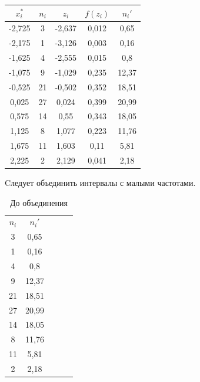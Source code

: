 \documentclass{article}
\begin{document}
\begin{center}
    \begin{table}[h]
        \centering
        \begin{tabular}{|*{5}{c|}}
            \hline
            $x_i^*$& $n_i$ &$z_i$ &$f(z_i)$& $n_i'$\\
            \hline
            -2,725 & 3 & -2,637 & 0,012 & 0,65 \\
            \hline
            -2,175 & 1 & -3,126 & 0,003 & 0,16 \\
            \hline
            -1,625 & 4 & -2,555 & 0,015 & 0,8 \\
            \hline
            -1,075 & 9 & -1,029 & 0,235 & 12,37 \\
            \hline
            -0,525 & 21 & -0,502 & 0,352 & 18,51 \\
            \hline
            0,025 & 27 & 0,024 & 0,399 & 20,99 \\
            \hline
            0,575 & 14 & 0,55 & 0,343 & 18,05 \\
            \hline
            1,125 & 8 & 1,077 & 0,223 & 11,76 \\
            \hline
            1,675 & 11 & 1,603 & 0,11 & 5,81 \\
            \hline
            2,225 & 2 & 2,129 & 0,041 & 2,18\\
            \hline
        \end{tabular}
    \end{table}
\end{center}
Cледует объединить интервалы с малыми частотами.
\begin{center}
    \begin{table}[h]
        \centering
        \begin{tabular}{|*{5}{c|}}
            \hline
            $n_i$ &$n_i'$\\
            3 & 0,65 \\
            \hline
            1 & 0,16 \\
            \hline
            4 & 0,8 \\
            \hline
            9 & 12,37 \\
            \hline
            21 & 18,51 \\
            \hline
            27 & 20,99 \\
            \hline
            14 & 18,05 \\
            \hline
            8 & 11,76 \\
            \hline
            11 & 5,81 \\
            \hline
            2 & 2,18\\
            \hline
        \end{tabular}
        \caption{До объединения}
    \end{table}
\end{center}
\end{document}
